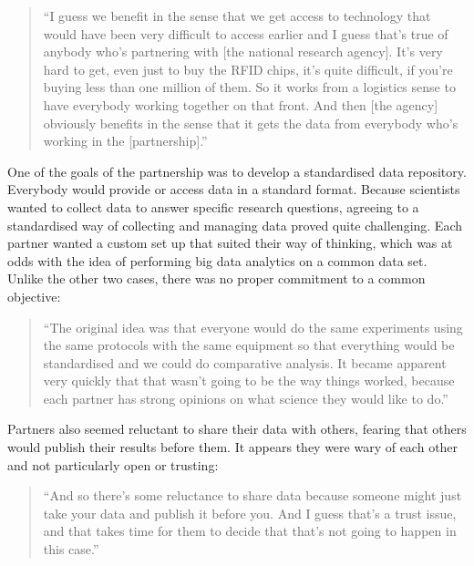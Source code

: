 \begin{quote}
\small
\enquote{I guess we benefit in the sense that we get access to technology that would have been very difficult to access earlier and I guess that's true of anybody who’s partnering with [the national research agency]. It's very hard to get, even just to buy the RFID chips, it's quite difficult, if you're buying less than one million of them. So it works from a logistics sense to have everybody working together on that front. And then [the agency] obviously benefits in the sense that it gets the data from everybody who's working in the [partnership].} \\
\end{quote}
 
One of the goals of the partnership was to develop a standardised data repository. Everybody would provide or access data in a standard format. Because scientists wanted to collect data to answer specific research questions, agreeing to a standardised way of collecting and managing data proved quite challenging. Each partner wanted a custom set up that suited their way of thinking, which was at odds with the idea of performing big data analytics on a common data set. Unlike the other two cases, there was no proper commitment to a common objective:

\begin{quote}
\small
\enquote{The original idea was that everyone would do the same experiments using the same protocols with the same equipment so that everything would be standardised and we could do comparative analysis. It became apparent very quickly that that wasn't going to be the way things worked, because each partner has strong opinions on what science they would like to do.} \\
\end{quote}

Partners also seemed reluctant to share their data with others, fearing that others would publish their results before them. It appears they were wary of each other and not particularly open or trusting:

\begin{quote}
\small
\enquote{And so there's some reluctance to share data because someone might just take your data and publish it before you. And I guess that's a trust issue, and that takes time for them to decide that that's not going to happen in this case.} \\
\end{quote}

